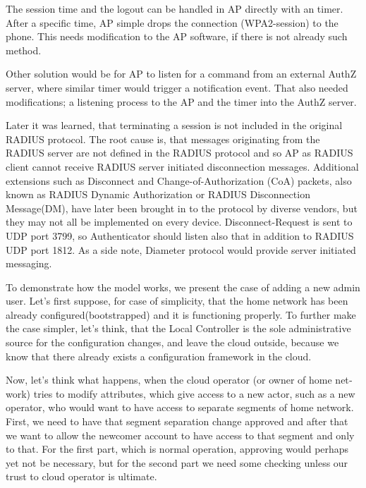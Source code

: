 \documentclass[12pt,a4paper,english]{tutthesis}
\begin{document}
\begin{otherlanguage}{english}
The session time and the logout can be handled in AP directly with
an timer. After a specific time, AP simple drops the connection
(WPA2-session) to the phone. This needs modification to the AP
software, if there is not already such method.

Other solution would be for AP to listen for a command from an external
AuthZ server, where similar timer would trigger a notification event. 
That also needed modifications;  a listening process to the AP and 
the timer into the AuthZ server. 




Later it was learned\cite{rfc2865}, that terminating a session is not
included in the original RADIUS protocol.  The root cause is, that
messages originating from the RADIUS server are not defined in the
RADIUS protocol and so AP as RADIUS client cannot receive RADIUS
server initiated disconnection messages.  Additional extensions such
as Disconnect and Change-of-Authorization (CoA) packets, also known as
RADIUS Dynamic Authorization or RADIUS Disconnection Message(DM)\cite{rfc5176}, have
later been brought in to the protocol by diverse
vendors, but they may not all be implemented on every device.
Disconnect-Request is sent to UDP port 3799, so Authenticator should
listen also that in addition to RADIUS UDP port 1812.
As a side note, Diameter protocol would provide server initiated messaging.



To demonstrate how the model works, we present the case of adding a
new admin user. Let's first suppose, for case of simplicity, that the
home network has been already configured(bootstrapped) and it is
functioning properly.  To further make the case simpler, let's think,
that the Local Controller is the sole administrative source for the
configuration changes, and leave the cloud outside, 
because we know that there already exists a configuration framework in the cloud.


Now, let's think what happens, when the cloud operator (or owner of
home network) tries to modify attributes, which give access to a new actor,
such as a new operator, who would want to have access to separate
segments of home network.  First, we need to have that segment separation
change approved and after that we want to allow the newcomer account
to have access to that segment and only to that. For the first part,
which is normal operation, approving would perhaps yet not be
necessary, but for the second part we need some checking unless our
trust to cloud operator is ultimate.  


\end{otherlanguage}
\end{document}
